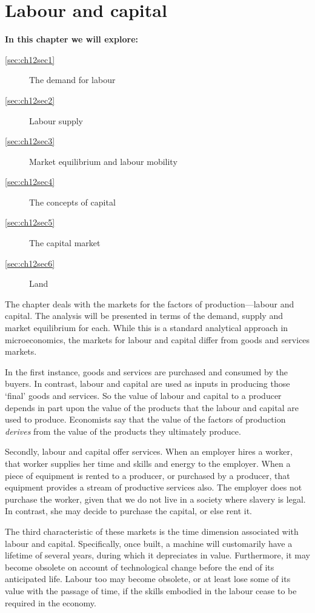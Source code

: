 \chapter{Labour and capital}\label{chap:marketlabourcapital}

\begin{topics}
	\textbf{In this chapter we will explore:}
	\begin{description}
		\item[\ref{sec:ch12sec1}] The demand for labour
		\item[\ref{sec:ch12sec2}] Labour supply
		\item[\ref{sec:ch12sec3}] Market equilibrium and labour mobility
		\item[\ref{sec:ch12sec4}] The concepts of capital
		\item[\ref{sec:ch12sec5}] The capital market
		\item[\ref{sec:ch12sec6}] Land
	\end{description}
\end{topics}

The chapter deals with the markets for the factors of production---labour
and capital. The analysis will be presented in terms of the demand, supply
and market equilibrium for each. While this is a standard analytical
approach in microeconomics, the markets for labour and capital differ from
goods and services markets. 

In the first instance, goods and services are purchased and consumed by
the buyers. In contrast, labour and capital are used as inputs in producing
those `final' goods and services. So the value of labour and capital to a
producer depends in part upon the value of the products that the labour and
capital are used to produce. Economists say that the value of the factors of
production \textit{derives} from the value of the products they ultimately
produce.

Secondly, labour and capital offer services. When an employer hires a worker,
that worker supplies her time and skills and energy to the employer. When a
piece of equipment is rented to a producer, or purchased by a producer, that
equipment provides a stream of productive services also. The employer does
not purchase the worker, given that we do not live in a society where
slavery is legal. In contrast, she may decide to purchase the capital, or
else rent it.

The third characteristic of these markets is the time dimension associated
with labour and capital. Specifically, once built, a machine will
customarily have a lifetime of several years, during which it depreciates in
value. Furthermore, it may become obsolete on account of technological
change before the end of its anticipated life. Labour too may become
obsolete, or at least lose some of its value with the passage of time, if
the skills embodied in the labour cease to be required in the economy.